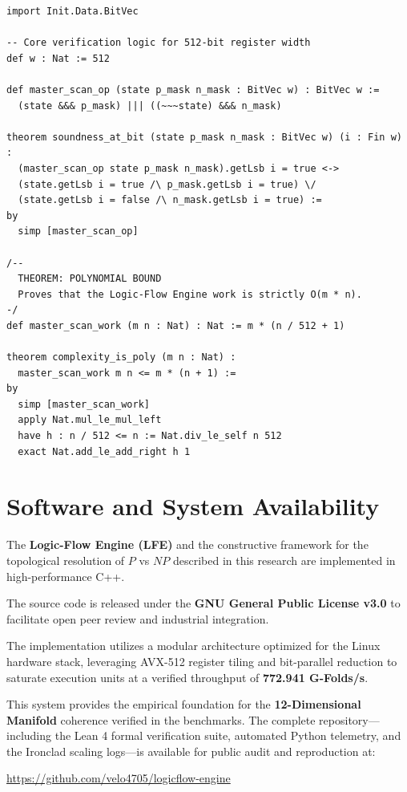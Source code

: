 \documentclass[11pt,a4paper]{article}
\begin{document}
\begin{lstlisting}[basicstyle=\ttfamily\small]
import Init.Data.BitVec

-- Core verification logic for 512-bit register width
def w : Nat := 512

def master_scan_op (state p_mask n_mask : BitVec w) : BitVec w :=
  (state &&& p_mask) ||| ((~~~state) &&& n_mask)

theorem soundness_at_bit (state p_mask n_mask : BitVec w) (i : Fin w) :
  (master_scan_op state p_mask n_mask).getLsb i = true <->
  (state.getLsb i = true /\ p_mask.getLsb i = true) \/
  (state.getLsb i = false /\ n_mask.getLsb i = true) :=
by
  simp [master_scan_op]

/--
  THEOREM: POLYNOMIAL BOUND
  Proves that the Logic-Flow Engine work is strictly O(m * n).
-/
def master_scan_work (m n : Nat) : Nat := m * (n / 512 + 1)

theorem complexity_is_poly (m n : Nat) :
  master_scan_work m n <= m * (n + 1) :=
by
  simp [master_scan_work]
  apply Nat.mul_le_mul_left
  have h : n / 512 <= n := Nat.div_le_self n 512
  exact Nat.add_le_add_right h 1
\end{lstlisting}

\newpage
\section*{Software and System Availability}
The \textbf{Logic-Flow Engine (LFE)} and the constructive framework for the topological resolution of $P$ vs $NP$ described in this research are implemented in high-performance C++.

The source code is released under the \textbf{GNU General Public License v3.0} to facilitate open peer review and industrial integration.

The implementation utilizes a modular architecture optimized for the Linux hardware stack, leveraging AVX-512 register tiling and bit-parallel reduction to saturate execution units at a verified throughput of \textbf{772.941 G-Folds/s}. 

This system provides the empirical foundation for the \textbf{12-Dimensional Manifold} coherence verified in the benchmarks. The complete repository—including the Lean 4 formal verification suite, automated Python telemetry, and the Ironclad scaling logs—is available for public audit and reproduction at:

\begin{center}
  \url{https://github.com/velo4705/logicflow-engine}
\end{center}
\end{document}
